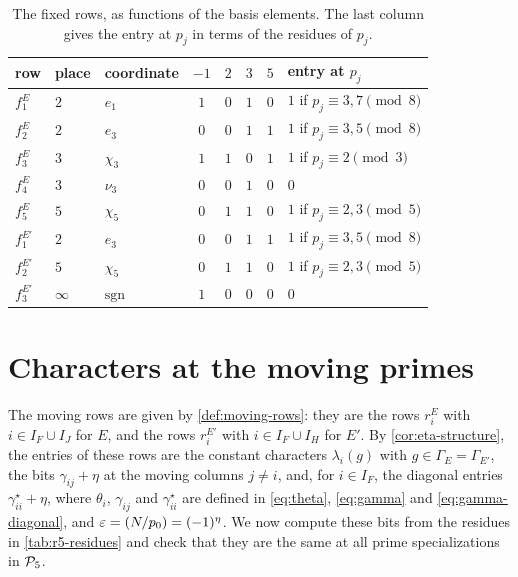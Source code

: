 \begin{table}[htbp]
\centering
\caption{The fixed rows, as functions of the basis elements. The last column gives the entry at $p_j$ in terms of the residues of $p_j$.}\label{tab:r5-fixed-rows}
\begin{tabular}{lllccccl}
\toprule
row & place & coordinate & $-1$ & $2$ & $3$ & $5$ & entry at $p_j$\\
\midrule
$f^E_1$ & $2$ & $e_1$ & $1$ & $0$ & $1$ & $0$ & $1$ if $p_j\equiv3,7\pmod8$\\
$f^E_2$ & $2$ & $e_3$ & $0$ & $0$ & $1$ & $1$ & $1$ if $p_j\equiv3,5\pmod8$\\
$f^E_3$ & $3$ & $\chi_3$ & $1$ & $1$ & $0$ & $1$ & $1$ if $p_j\equiv2\pmod3$\\
$f^E_4$ & $3$ & $\nu_3$ & $0$ & $0$ & $1$ & $0$ & $0$\\
$f^E_5$ & $5$ & $\chi_5$ & $0$ & $1$ & $1$ & $0$ & $1$ if $p_j\equiv2,3\pmod5$\\
\midrule
$f^{E'}_1$ & $2$ & $e_3$ & $0$ & $0$ & $1$ & $1$ & $1$ if $p_j\equiv3,5\pmod8$\\
$f^{E'}_2$ & $5$ & $\chi_5$ & $0$ & $1$ & $1$ & $0$ & $1$ if $p_j\equiv2,3\pmod5$\\
$f^{E'}_3$ & $\infty$ & $\mathrm{sgn}$ & $1$ & $0$ & $0$ & $0$ & $0$\\
\bottomrule
\end{tabular}
\end{table}

\section{Characters at the moving primes}\label{sec:r5-characters}

The moving rows are given by \cref{def:moving-rows}: they are the rows $r^E_i$ with $i\in I_F\cup I_J$ for $E$, and the rows $r^{E'}_i$ with $i\in I_F\cup I_H$ for $E'$. By \cref{cor:eta-structure}, the entries of these rows are the constant characters $\lambda_i(g)$ with $g\in\Gamma_E=\Gamma_{E'}$, the bits $\gamma_{ij}+\eta$ at the moving columns $j\ne i$, and, for $i\in I_F$, the diagonal entries $\gamma^\star_{ii}+\eta$, where $\theta_i$, $\gamma_{ij}$ and $\gamma^\star_{ii}$ are defined in \eqref{eq:theta}, \eqref{eq:gamma} and \eqref{eq:gamma-diagonal}, and $\eps=\leg N{p_0}=(-1)^\eta$. We now compute these bits from the residues in \cref{tab:r5-residues} and check that they are the same at all prime specializations in $\mathcal P_5$.

